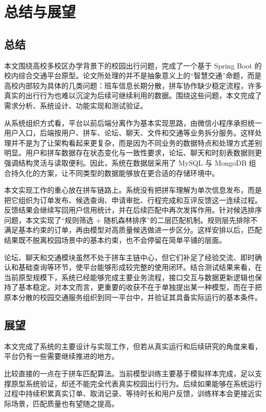 \chapter{总结与展望}\label{chap:conclusion}

\section{总结}

本文围绕高校多校区办学背景下的校园出行问题，完成了一个基于 Spring Boot 的校内综合交通平台原型。论文所处理的并不是抽象意义上的“智慧交通”命题，而是高校内部较为具体的几类问题：班车信息长期分散，拼车协作缺少稳定流程，许多真实的出行行为也难以沉淀为后续可继续利用的数据。围绕这些问题，本文完成了需求分析、系统设计、功能实现和测试验证。

从系统组织方式看，平台以前后端分离作为基本实现思路，由微信小程序承担统一用户入口，后端按用户、拼车、论坛、聊天、文件和交通等业务拆分服务。这样处理并不是为了让架构看起来更复杂，而是因为不同业务的数据特点和处理方式差别明显。用户和拼车数据存在状态变化与一致性要求，论坛、聊天和时刻表数据则更强调结构灵活与读取便利。因此，系统在数据层采用了 MySQL 与 MongoDB 组合持久化的方案，让不同类型的数据能够放在更合适的存储环境中。

本文实现工作的重心放在拼车链路上。系统没有把拼车理解为单次信息发布，而是把它组织为订单发布、候选查询、申请审批、行程完成和互评反馈这一连续过程。反馈结果会继续写回用户信用统计，并在后续匹配中再次发挥作用。针对候选排序问题，本文实现了“规则筛选 + 随机森林排序”的二层匹配机制。规则层先排除不满足基本约束的订单，再由模型对高质量候选做进一步区分。这样安排以后，匹配结果既不脱离校园场景中的基本约束，也不会停留在简单平铺的层面。

论坛、聊天和交通模块虽然不处于拼车主链中心，但它们补足了经验交流、即时确认和基础查询等环节，使平台能够形成较完整的使用闭环。结合测试结果来看，在当前原型规模下，系统已经能够完成主要业务流程，接口交互与数据更新逻辑也保持了基本稳定。对本文而言，更重要的收获不在于单独提出某一种模型，而在于把原本分散的校园交通服务组织到同一平台中，并验证其具备实际运行的基本条件。
\section{展望}

本文完成了系统的主要设计与实现工作，但若从真实运行和后续研究的角度来看，平台仍有一些需要继续推进的地方。

比较直接的一点在于拼车匹配算法。当前模型训练主要基于模拟样本完成，足以支撑原型系统验证，却还不能完全代表真实校园出行行为。后续如果能够在系统运行过程中持续积累真实订单、取消记录、等待时长和用户反馈，训练样本会更接近实际场景，匹配质量也有望随之提高。


